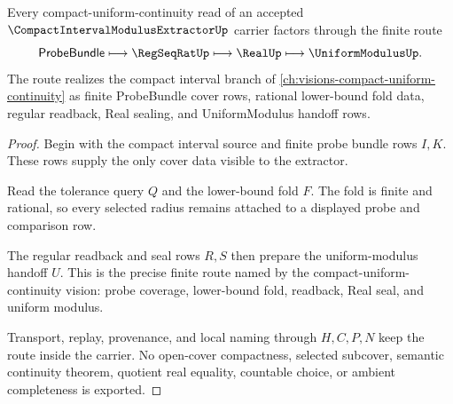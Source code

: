 \begin{theorem}
\label{thm:compact-interval-modulus-extractor-vision-handoff}
Every compact-uniform-continuity read of an accepted $\CompactIntervalModulusExtractorUp$ carrier factors through the finite route
$$
\mathsf{ProbeBundle}
\longmapsto
\RegSeqRatUp
\longmapsto
\RealUp
\longmapsto
\UniformModulusUp .
$$
The route realizes the compact interval branch of \autoref{ch:visions-compact-uniform-continuity} as finite ProbeBundle cover rows, rational lower-bound fold data, regular readback, Real sealing, and UniformModulus handoff rows.
\end{theorem}
\begin{proof}
Begin with the compact interval source and finite probe bundle rows $I,K$. These rows supply the only cover data visible to the extractor.

Read the tolerance query $Q$ and the lower-bound fold $F$. The fold is finite and rational, so every selected radius remains attached to a displayed probe and comparison row.

The regular readback and seal rows $R,S$ then prepare the uniform-modulus handoff $U$. This is the precise finite route named by the compact-uniform-continuity vision: probe coverage, lower-bound fold, readback, Real seal, and uniform modulus.

Transport, replay, provenance, and local naming through $H,C,P,N$ keep the route inside the carrier. No open-cover compactness, selected subcover, semantic continuity theorem, quotient real equality, countable choice, or ambient completeness is exported.
\end{proof}



